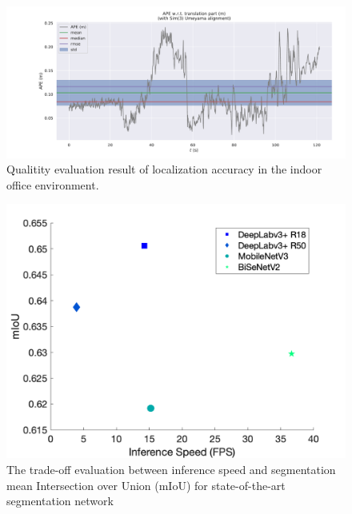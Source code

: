  \begin{figure}[!ht]
    \centering
    \includegraphics[width=\columnwidth]{figure/pqe/lio2.pdf}
    \caption{Qualitity evaluation result of localization accuracy in the indoor office environment.}
    \label{localizationeva}
 \end{figure}
 \begin{figure}[!ht]
    \centering
    \includegraphics[width=0.75\columnwidth]{figure/pqe/Trade-off.png}
    \caption{The trade-off evaluation between inference speed and segmentation mean Intersection over Union (mIoU) for state-of-the-art segmentation network\cite{yu2021bisenet,howard2019searching,chen2018encoder} }
    \label{cross-evaluation}
 \end{figure}

